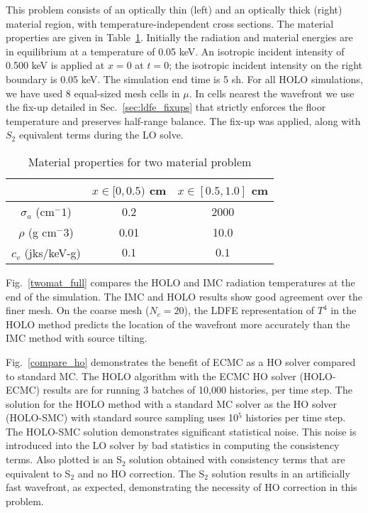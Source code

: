 This problem consists of an optically thin (left) and an optically thick (right) material region,
with temperature-independent cross sections.  The material properties are given in
Table~\ref{two_mat_props}.  Initially the radiation and material energies are in
equilibrium at a temperature of 0.05 keV.  An isotropic incident intensity of 0.500 keV
is applied at $x=0$ at $t=0$; the isotropic incident intensity on the right boundary is 0.05
keV.  The simulation end time is 5 sh. For all HOLO simulations, we have used 8
equal-sized mesh cells in $\mu$.  In cells nearest the wavefront we
use the fix-up detailed in Sec.~\ref{sec:ldfe_fixups} that strictly enforces the floor temperature and preserves half-range
balance.  The fix-up was applied, along with $S_2$ equivalent terms during the LO solve.
\begin{table}[H]
        \caption{Material properties for two material problem\label{two_mat_props}}
\centering
        \begin{tabular}{|c|cc|}  \cline{2-3}
            \multicolumn{1}{c|}{}   & $x \in [0,0.5)$ cm & $x \in [0.5,1.0]$ cm   \\ \hline
            $\sigma_a$ (cm$^-1$)  & 0.2 & 2000 \\
            $\rho$ (g cm$^-3$) & 0.01 & 10.0 \\
            $c_v$ (jks/keV-g) & $0.1$ & $0.1$ \\ \hline
        \end{tabular}
\end{table}

Fig.~\ref{twomat_full} compares the HOLO and IMC radiation 
temperatures at the end of the simulation. The
IMC and HOLO results show good agreement
over the finer mesh.
On the coarse mesh ($N_c=20$), the LDFE representation of $T^4$ in the HOLO method predicts the location of the
wavefront more accurately than the IMC method with source tilting.

Fig.~\ref{compare_ho} demonstrates the benefit of ECMC as a HO solver compared to
standard MC.  The HOLO algorithm
with the ECMC HO solver (HOLO-ECMC) results
are for running 3 batches of 10,000 histories, per time step. The solution for the HOLO method with a standard MC solver as the HO solver
(HOLO-SMC) with standard source sampling uses 10$^5$ histories per time step. The HOLO-SMC solution demonstrates significant
statistical noise.  This noise is introduced into the LO solver by bad statistics in
computing the consistency terms. Also
plotted is an S$_2$ solution obtained with consistency terms that are equivalent
to S$_2$ and no HO correction.  The S$_2$ solution results in an artificially fast
wavefront, as expected, demonstrating the necessity of HO correction in this problem.

